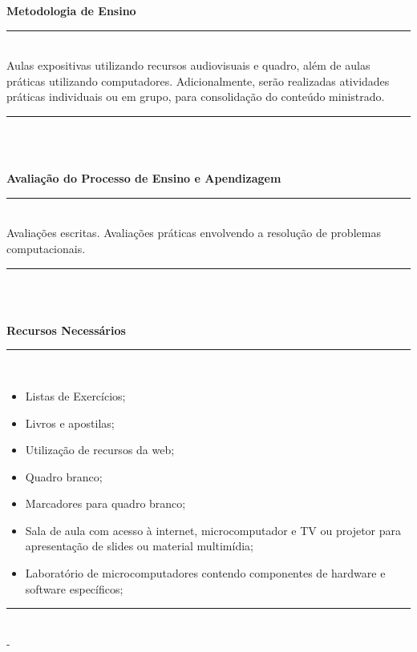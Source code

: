 \vspace{-12mm}
\begin{center}\textbf{Metodologia de Ensino}\end{center} 
\vspace{-5mm}
\noindent\rule{16.5cm}{0.4pt}
\\
   Aulas expositivas utilizando recursos audiovisuais e quadro, além de aulas práticas utilizando computadores. Adicionalmente, serão realizadas atividades práticas individuais ou em grupo, para consolidação do conteúdo ministrado.\\
\noindent\rule{16.5cm}{0.4pt}\\
\\
\vspace{-12mm}
\begin{center}\textbf{Avaliação do Processo de Ensino e Apendizagem}\end{center}
\vspace{-5mm}
\noindent\rule{16.5cm}{0.4pt}
\\
   Avaliações escritas. Avalia\c{c}\~oes pr\'aticas envolvendo a resolu\c{c}\~ao de problemas computacionais.\\
\noindent\rule{16.5cm}{0.4pt}\\
\\
\vspace{-12mm}
\begin{center}\textbf{Recursos Necessários}\end{center}
\vspace{-5mm}
\noindent\rule{16.5cm}{0.4pt}
\\
\begin{itemize} 
  \item Listas de Exercícios;
  \item Livros e apostilas;
  \item Utilização de recursos da web;
  \item Quadro branco;
  \item Marcadores para quadro branco;
  \item Sala de aula com acesso à internet, microcomputador e TV ou projetor para apresentação de slides ou material multimídia;
  \item Laboratório de microcomputadores contendo componentes de hardware e software específicos;
\end{itemize}
\noindent\rule{16.5cm}{0.4pt}\\ - 
\\

